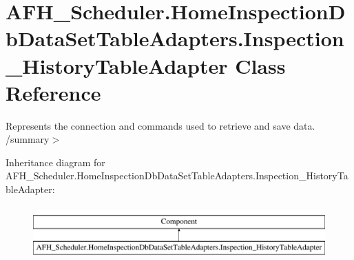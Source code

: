 \section{A\+F\+H\+\_\+\+Scheduler.\+Home\+Inspection\+Db\+Data\+Set\+Table\+Adapters.\+Inspection\+\_\+\+History\+Table\+Adapter Class Reference}
\label{class_a_f_h___scheduler_1_1_home_inspection_db_data_set_table_adapters_1_1_inspection___history_table_adapter}


Represents the connection and commands used to retrieve and save data. /summary$>$  


Inheritance diagram for A\+F\+H\+\_\+\+Scheduler.\+Home\+Inspection\+Db\+Data\+Set\+Table\+Adapters.\+Inspection\+\_\+\+History\+Table\+Adapter\+:\begin{figure}[H]
\begin{center}
\leavevmode
\includegraphics[height=2.000000cm]{class_a_f_h___scheduler_1_1_home_inspection_db_data_set_table_adapters_1_1_inspection___history_table_adapter}
\end{center}
\end{figure}
